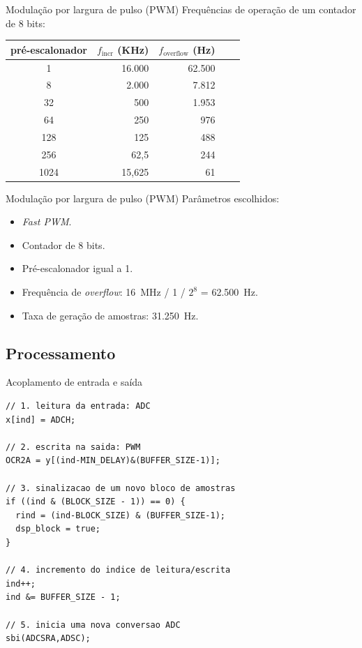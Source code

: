 \begin{frame}{Modulação por largura de pulso (PWM)}
Frequências de operação de um contador de 8 bits:
\begin{center}
\begin{tabular}{crrrr}
\toprule
\toprule
\footnotesize{pré-escalonador} &
\footnotesize{$f_\text{incr}$ (KHz)} &
\footnotesize{$f_\text{overflow}$ (Hz)}  \\
\midrule
\rowcolor{LightCyan}
1 & 16.000 & 62.500 \\
8 & 2.000 & 7.812 \\
32 & 500 & 1.953 \\
64 & 250 & 976 \\
128 & 125 & 488 \\
256 & 62,5 & 244 \\
1024 & 15,625 & 61 \\
\bottomrule
\end{tabular}
\end{center}
\end{frame}

\begin{frame}{Modulação por largura de pulso (PWM)}
Parâmetros escolhidos:
\begin{itemize}
  \item \emph{Fast PWM}.
  \item Contador de 8 bits.
  \item Pré-escalonador igual a 1.
  \item Frequência de \emph{overflow}: 16~MHz / 1 / $2^8$ = 62.500~Hz.
  \item Taxa de geração de amostras: 31.250~Hz.
\end{itemize}
\end{frame}
\subsection{Processamento}


\begin{frame}[fragile]{Acoplamento de entrada e saída}
\begin{lstlisting}
// 1. leitura da entrada: ADC
x[ind] = ADCH;

// 2. escrita na saida: PWM
OCR2A = y[(ind-MIN_DELAY)&(BUFFER_SIZE-1)];

// 3. sinalizacao de um novo bloco de amostras
if ((ind & (BLOCK_SIZE - 1)) == 0) {
  rind = (ind-BLOCK_SIZE) & (BUFFER_SIZE-1);
  dsp_block = true;
}

// 4. incremento do indice de leitura/escrita
ind++;
ind &= BUFFER_SIZE - 1;

// 5. inicia uma nova conversao ADC
sbi(ADCSRA,ADSC); 
\end{lstlisting}
\end{frame}


